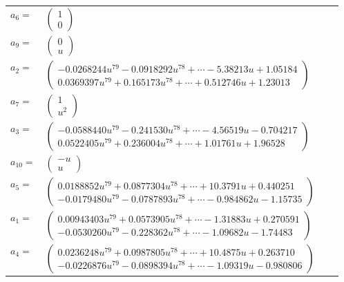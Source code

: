 \documentclass[1p]{elsarticle_modified}
\theoremstyle{definition}
\begin{document}
\begin{tabular}{m{7pt} m{180pt} m{7pt} m{180pt} }
\flushright $a_{6}=$&$\begin{pmatrix}1\\0\end{pmatrix}$ \\
\flushright $a_{9}=$&$\begin{pmatrix}0\\u\end{pmatrix}$ \\
\flushright $a_{2}=$&$\begin{pmatrix}-0.0268244 u^{79}-0.0918292 u^{78}+\cdots-5.38213 u+1.05184\\0.0369397 u^{79}+0.165173 u^{78}+\cdots+0.512746 u+1.23013\end{pmatrix}$ \\
\flushright $a_{7}=$&$\begin{pmatrix}1\\u^2\end{pmatrix}$ \\
\flushright $a_{3}=$&$\begin{pmatrix}-0.0588440 u^{79}-0.241530 u^{78}+\cdots-4.56519 u-0.704217\\0.0522405 u^{79}+0.236004 u^{78}+\cdots+1.01761 u+1.96528\end{pmatrix}$ \\
\flushright $a_{10}=$&$\begin{pmatrix}- u\\u\end{pmatrix}$ \\
\flushright $a_{5}=$&$\begin{pmatrix}0.0188852 u^{79}+0.0877304 u^{78}+\cdots+10.3791 u+0.440251\\-0.0179480 u^{79}-0.0787893 u^{78}+\cdots-0.984862 u-1.15735\end{pmatrix}$ \\
\flushright $a_{1}=$&$\begin{pmatrix}0.00943403 u^{79}+0.0573905 u^{78}+\cdots-1.31883 u+0.270591\\-0.0530260 u^{79}-0.228362 u^{78}+\cdots-1.09682 u-1.74483\end{pmatrix}$ \\
\flushright $a_{4}=$&$\begin{pmatrix}0.0236248 u^{79}+0.0987805 u^{78}+\cdots+10.4875 u+0.263710\\-0.0226876 u^{79}-0.0898394 u^{78}+\cdots-1.09319 u-0.980806\end{pmatrix}$ \\

\end{tabular}
\end{document}
